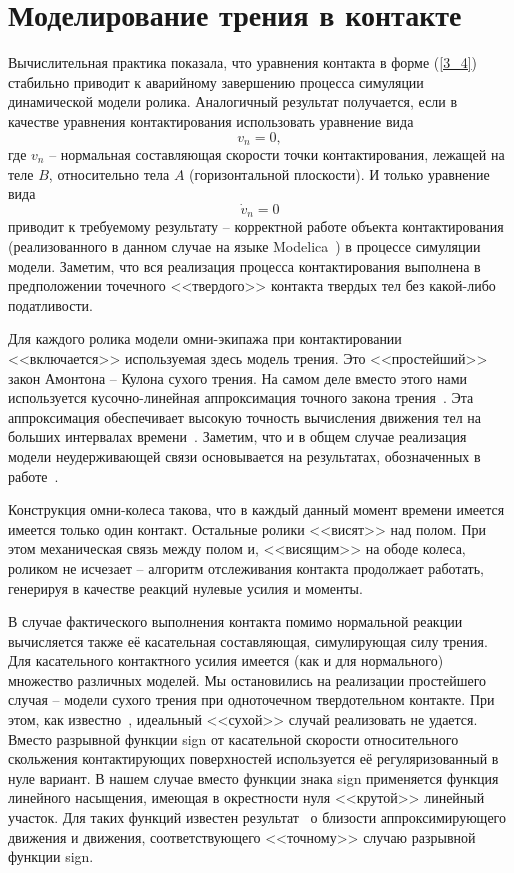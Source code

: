 \section{Моделирование трения в контакте}

Вычислительная практика показала, что уравнения контакта в форме (\ref{3_4})
стабильно приводит к аварийному завершению процесса симуляции динамической 
модели ролика. Аналогичный результат получается, если в качестве уравнения 
контактирования использовать уравнение вида 
$$
v_n=0,
$$
где $v_n$ -- нормальная составляющая скорости точки контактирования, лежащей
на теле $B$, относительно тела $A$ (горизонтальной плоскости). И только 
уравнение вида
$$
\dot{v}_n=0
$$
приводит к требуемому результату -- корректной работе объекта контактирования
(реализованного в данном случае на языке Modelica~\cite{Fritzson}) в процессе 
симуляции модели. Заметим, что вся реализация процесса контактирования 
выполнена в предположении точечного <<твердого>> контакта твердых тел без 
какой-либо податливости.

Для каждого ролика модели омни-экипажа при контактировании <<включается>>
используемая здесь модель трения. Это <<простейший>> закон Амонтона -- Кулона
сухого трения. На самом деле вместо этого нами используется кусочно-линейная 
аппроксимация точного закона трения~\cite{Kosenko2006unilat}. Эта аппроксимация 
обеспечивает высокую точность вычисления движения тел на больших интервалах 
времени~\cite{Novozhilov1991}. Заметим, что и в общем случае реализация модели 
неудерживающей связи основывается на результатах, обозначенных в 
работе~\cite{Kosenko2006unilat}.

Конструкция омни-колеса такова, что в каждый данный 
момент времени имеется имеется только один контакт. Остальные ролики <<висят>>
над полом. При этом механическая связь между полом и, <<висящим>> на ободе
колеса, роликом не исчезает -- алгоритм отслеживания контакта продолжает 
работать, генерируя в качестве реакций нулевые усилия и моменты.

В случае фактического выполнения контакта помимо нормальной реакции вычисляется
также её касательная составляющая, симулирующая силу трения. Для касательного 
контактного усилия имеется (как и для нормального) множество различных моделей. 
Мы остановились на реализации простейшего случая -- модели сухого трения при 
одноточечном твердотельном контакте. При этом, как известно~\cite{Novozhilov1991}, 
идеальный <<сухой>> случай реализовать не удается. Вместо разрывной функции 
sign от касательной скорости относительного скольжения контактирующих 
поверхностей используется её регуляризованный в нуле вариант. В нашем случае 
вместо функции знака sign применяется функция линейного насыщения, имеющая в 
окрестности нуля <<крутой>> линейный участок. Для таких функций известен 
результат~\cite{Novozhilov1991} о близости аппроксимирующего движения и движения, соответствующего <<точному>> случаю разрывной функции sign.


